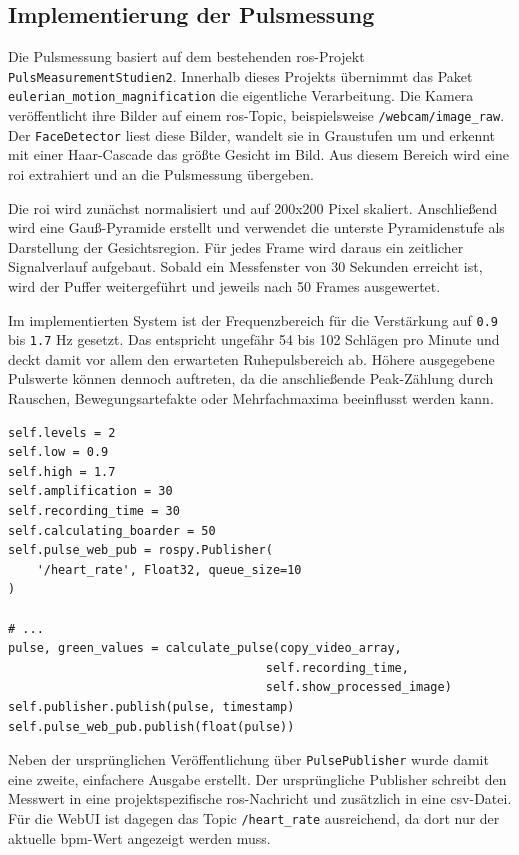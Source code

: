 \subsection{Implementierung der Pulsmessung}

Die Pulsmessung basiert auf dem bestehenden \ac{ros}-Projekt \texttt{PulsMeasurementStudien2}. Innerhalb dieses Projekts übernimmt das Paket \texttt{eulerian\_motion\_magnification} die eigentliche Verarbeitung. Die Kamera veröffentlicht ihre Bilder auf einem \ac{ros}-Topic, beispielsweise \texttt{/webcam/image\_raw}. Der \texttt{FaceDetector} liest diese Bilder, wandelt sie in Graustufen um und erkennt mit einer Haar-Cascade das größte Gesicht im Bild. Aus diesem Bereich wird eine \ac{roi} extrahiert und an die Pulsmessung übergeben.

Die \ac{roi} wird zunächst normalisiert und auf 200x200 Pixel skaliert. Anschließend wird eine Gauß-Pyramide erstellt und verwendet die unterste Pyramidenstufe als Darstellung der Gesichtsregion. Für jedes Frame wird daraus ein zeitlicher Signalverlauf aufgebaut. Sobald ein Messfenster von 30 Sekunden erreicht ist, wird der Puffer weitergeführt und jeweils nach 50 Frames ausgewertet.

Im implementierten System ist der Frequenzbereich für die Verstärkung auf \texttt{0.9} bis \texttt{1.7} Hz gesetzt. Das entspricht ungefähr 54 bis 102 Schlägen pro Minute und deckt damit vor allem den erwarteten Ruhepulsbereich ab. Höhere ausgegebene Pulswerte können dennoch auftreten, da die anschließende Peak-Zählung durch Rauschen, Bewegungsartefakte oder Mehrfachmaxima beeinflusst werden kann.

\begin{lstlisting}[style=algoBericht,caption={Zentrale Parameter und WebUI-Publish der \acs{evm}-Pulsmessung}]
self.levels = 2
self.low = 0.9
self.high = 1.7
self.amplification = 30
self.recording_time = 30
self.calculating_boarder = 50
self.pulse_web_pub = rospy.Publisher(
    '/heart_rate', Float32, queue_size=10
)

# ...
pulse, green_values = calculate_pulse(copy_video_array,
                                    self.recording_time,
                                    self.show_processed_image)
self.publisher.publish(pulse, timestamp)
self.pulse_web_pub.publish(float(pulse))
\end{lstlisting}

Neben der ursprünglichen Veröffentlichung über \texttt{PulsePublisher} wurde damit eine zweite, einfachere Ausgabe erstellt. Der ursprüngliche Publisher schreibt den Messwert in eine projektspezifische \ac{ros}-Nachricht und zusätzlich in eine \ac{csv}-Datei. Für die WebUI ist dagegen das Topic \texttt{/heart\_rate} ausreichend, da dort nur der aktuelle \ac{bpm}-Wert angezeigt werden muss.

